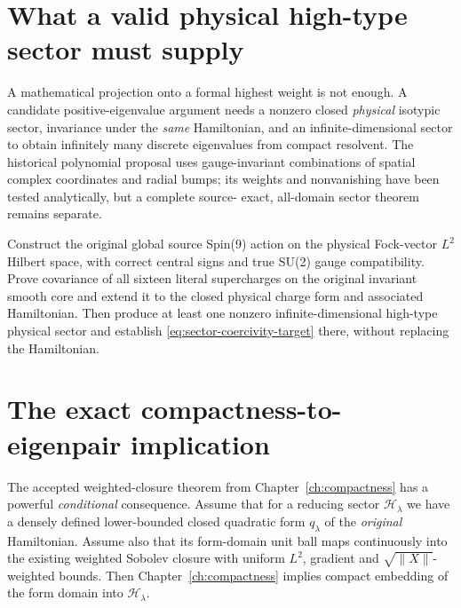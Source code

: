 \section{What a valid physical high-type sector must supply}
A mathematical projection onto a formal highest weight is not
enough. A candidate positive-eigenvalue argument needs a nonzero
closed \emph{physical} isotypic sector, invariance under the
\emph{same} Hamiltonian, and an infinite-dimensional sector to
obtain infinitely many discrete eigenvalues from compact resolvent.
The historical polynomial proposal uses gauge-invariant combinations
of spatial complex coordinates and radial bumps; its weights and
nonvanishing have been tested analytically, but a complete source-
exact, all-domain sector theorem remains separate.

\begin{openproblem}
Construct the original global source Spin(9) action on the physical
Fock-vector $L^2$ Hilbert space, with correct central signs and true
SU(2) gauge compatibility. Prove covariance of all sixteen literal
supercharges on the original invariant smooth core and extend it
to the closed physical charge form and associated Hamiltonian.
Then produce at least one nonzero infinite-dimensional high-type
physical sector and establish \eqref{eq:sector-coercivity-target}
there, without replacing the Hamiltonian.
\end{openproblem}

\section{The exact compactness-to-eigenpair implication}
The accepted weighted-closure theorem from
Chapter~\ref{ch:compactness} has a powerful \emph{conditional}
consequence. Assume that for a reducing sector $\mathcal H_\lambda$
we have a densely defined lower-bounded closed quadratic form
$q_\lambda$ of the \emph{original} Hamiltonian. Assume also that its
form-domain unit ball maps continuously into the existing weighted
Sobolev closure with uniform $L^2$, gradient and
$\sqrt{\|X\|}$-weighted bounds. Then Chapter~\ref{ch:compactness}
implies compact embedding of the form domain into
$\mathcal H_\lambda$.

